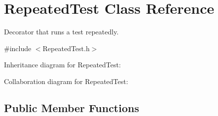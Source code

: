 \hypertarget{class_repeated_test}{\section{Repeated\+Test Class Reference}
\label{class_repeated_test}
}


Decorator that runs a test repeatedly.  




{\ttfamily \#include $<$Repeated\+Test.\+h$>$}



Inheritance diagram for Repeated\+Test\+:


Collaboration diagram for Repeated\+Test\+:
\subsection*{Public Member Functions}
